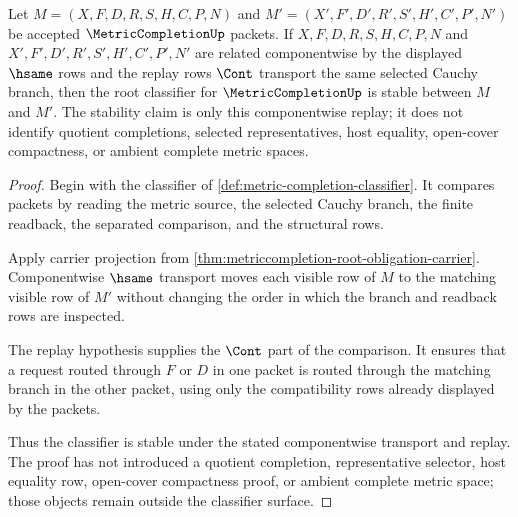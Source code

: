 \begin{theorem}
\label{thm:metriccompletion-root-obligation-classifier}
Let $M=(X,F,D,R,S,H,C,P,N)$ and $M'=(X',F',D',R',S',H',C',P',N')$ be accepted $\MetricCompletionUp$ packets. If $X,F,D,R,S,H,C,P,N$ and $X',F',D',R',S',H',C',P',N'$ are related componentwise by the displayed $\hsame$ rows and the replay rows $\Cont$ transport the same selected Cauchy branch, then the root classifier for $\MetricCompletionUp$ is stable between $M$ and $M'$. The stability claim is only this componentwise replay; it does not identify quotient completions, selected representatives, host equality, open-cover compactness, or ambient complete metric spaces.
\end{theorem}
\begin{proof}
Begin with the classifier of \autoref{def:metric-completion-classifier}. It compares packets by reading the metric source, the selected Cauchy branch, the finite readback, the separated comparison, and the structural rows.

Apply carrier projection from \autoref{thm:metriccompletion-root-obligation-carrier}. Componentwise $\hsame$ transport moves each visible row of $M$ to the matching visible row of $M'$ without changing the order in which the branch and readback rows are inspected.

The replay hypothesis supplies the $\Cont$ part of the comparison. It ensures that a request routed through $F$ or $D$ in one packet is routed through the matching branch in the other packet, using only the compatibility rows already displayed by the packets.

Thus the classifier is stable under the stated componentwise transport and replay. The proof has not introduced a quotient completion, representative selector, host equality row, open-cover compactness proof, or ambient complete metric space; those objects remain outside the classifier surface.
\end{proof}

